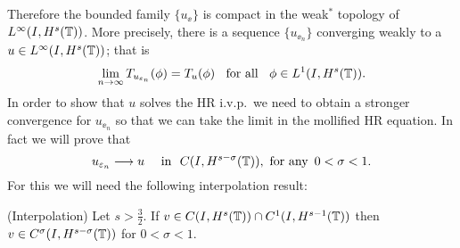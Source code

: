 Therefore the bounded family $\{u_\ee\}$ is compact 
in the weak$^*$ topology of \\
$L^\infty(I, H^s(\mathbb{T}))$. More precisely,
there is a sequence  $\{ u_{\ee_n} \}$ converging
weakly to a $ u\in L^{\infty}(I, H^s(\mathbb{T}))$;
that is 
%
\begin{equation}
\label{weak-conv}
\lim_{n\to \infty} T_{u_{\varepsilon_n}}(\phi)  =  T_u (\phi) 
\; \; \ 		
\text{for all} \ \;\;  \phi \in L^1(I, H^{s}(\mathbb{T})).
\end{equation}
%
In order to show that  $u$ solves the HR i.v.p.\ we need to 
obtain a stronger  convergence for  $u_{\ee_n}$ so that 
we can take the limit in the mollified HR equation.
In fact we will prove that 
%
\begin{equation}
\label{strong-conv}
u_{\varepsilon_n}\longrightarrow u
\quad
 \ \text{in} \ \,\,   C(I, H^{s-\sigma}(\mathbb{T})),\ \text{for any} \
\, 0 < \sigma <
1.
\end{equation}
%
For this we will need the following interpolation  result:
%
%
%
%
\begin{lemma}
\label{interpolation-lem}
(Interpolation)     Let  $s > \frac{3}{2}$.
If $v \in C(I, H^s(\mathbb{T})) \cap C^1(I, H^{s-1}(\mathbb{T}))$
then $v \in C^\sigma (I, H^{s- \sigma}(\mathbb{T}))$ for  $0 < \sigma < 1$.
\end{lemma}
%
